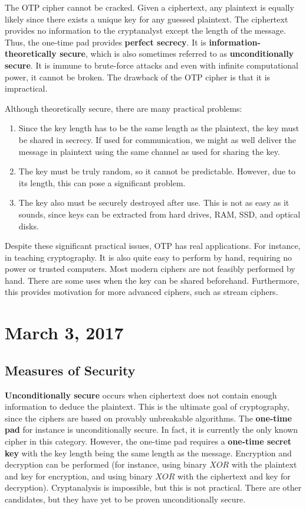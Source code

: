 \documentclass[11pt]{article}
\theoremstyle{plain} %
\theoremstyle{definition}
\theoremstyle{example}
\theoremstyle{remark}
\begin{document}
The OTP cipher cannot be cracked. Given a ciphertext, any plaintext is equally likely since there exists a unique key for any guessed plaintext. The ciphertext provides no information to the cryptanalyst except the length of the message. Thus, the one-time pad provides \textbf{perfect secrecy}. It is \textbf{information-theoretically secure}, which is also sometimes referred to as \textbf{unconditionally secure}. It is immune to brute-force attacks and even with infinite computational power, it cannot be broken. The drawback of the OTP cipher is that it is impractical. 

Although theoretically secure, there are many practical problems:
\begin{enumerate}
	\item Since the key length has to be the same length as the plaintext, the key must be shared in secrecy. If used for communication, we might as well deliver the message in plaintext using the same channel as used for sharing the key. 
	\item The key must be truly random, so it cannot be predictable. However, due to its length, this can pose a significant problem. 
	\item The key also must be securely destroyed after use. This is not as easy as it sounds, since keys can be extracted from hard drives, RAM, SSD, and optical disks. 
\end{enumerate}

Despite these significant practical issues, OTP has real applications. For instance, in teaching cryptography. It is also quite easy to perform by hand, requiring no power or trusted computers. Most modern ciphers are not feasibly performed by hand. There are some uses when the key can be shared beforehand. Furthermore, this provides motivation for more advanced ciphers, such as stream ciphers. 

\section{March 3, 2017}

\subsection{Measures of Security}

\textbf{Unconditionally secure} occurs when ciphertext does not contain enough information to deduce the plaintext. This is the ultimate goal of cryptography, since the ciphers are based on provably unbreakable algorithms. The \textbf{one-time pad} for instance is unconditionally secure. In fact, it is currently the only known cipher in this category. However, the one-time pad requires a \textbf{one-time secret key} with the key length being the same length as the message. Encryption and decryption can be performed (for instance, using binary $XOR$ with the plaintext and key for encryption, and using binary $XOR$ with the ciphertext and key for decryption). Cryptanalysis is impossible, but this is not practical. There are other candidates, but they have yet to be proven unconditionally secure. 
\end{document}
